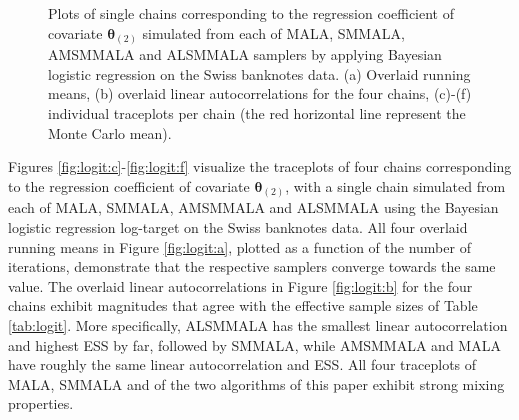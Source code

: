 \documentclass[twoside,11pt]{article}
\begin{document}
\begin{figure}[t]
{	} \\
	 \\
	\caption{
		Plots of single chains corresponding to the regression coefficient of covariate $\boldsymbol{\theta}_{(2)}$ 
		simulated from each of MALA, SMMALA, AMSMMALA and ALSMMALA samplers by applying Bayesian logistic regression on the 
		Swiss banknotes data. (a) Overlaid running means, (b) overlaid linear autocorrelations for the four chains, (c)-(f) 
		individual traceplots per chain (the red horizontal line represent the Monte Carlo mean).
	}
	\label{fig:logit}
\end{figure}

Figures \ref{fig:logit:c}-\ref{fig:logit:f} visualize the traceplots of four chains corresponding to the regression 
coefficient of covariate $\boldsymbol{\theta}_{(2)}$, with a single chain simulated from each of MALA, SMMALA, AMSMMALA and 
ALSMMALA using the Bayesian logistic regression log-target on the Swiss banknotes data. All four overlaid running means in 
Figure \ref{fig:logit:a}, plotted as a function of the number of iterations, demonstrate that the respective samplers 
converge towards the same value. The overlaid linear autocorrelations in Figure \ref{fig:logit:b} for the four chains 
exhibit magnitudes that agree with the effective sample sizes of Table \ref{tab:logit}. More specifically, ALSMMALA has the 
smallest linear autocorrelation and highest ESS by far, followed by SMMALA, while AMSMMALA and MALA have roughly the same 
linear autocorrelation and ESS. All four traceplots of MALA, SMMALA and of the two algorithms of this paper exhibit strong 
mixing properties.
\end{document}
